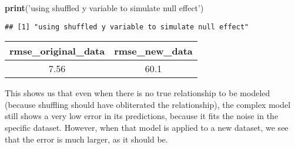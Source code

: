 \documentclass[]{book}
\newenvironment{Shaded}{\begin{snugshade}}{\end{snugshade}}
\newcommand{\KeywordTok}[1]{\textcolor[rgb]{0.13,0.29,0.53}{\textbf{#1}}}
\newcommand{\DataTypeTok}[1]{\textcolor[rgb]{0.13,0.29,0.53}{#1}}
\newcommand{\DecValTok}[1]{\textcolor[rgb]{0.00,0.00,0.81}{#1}}
\newcommand{\StringTok}[1]{\textcolor[rgb]{0.31,0.60,0.02}{#1}}
\newcommand{\OtherTok}[1]{\textcolor[rgb]{0.56,0.35,0.01}{#1}}
\newcommand{\OperatorTok}[1]{\textcolor[rgb]{0.81,0.36,0.00}{\textbf{#1}}}
\newcommand{\NormalTok}[1]{#1}
\theoremstyle{definition}
\theoremstyle{definition}
\theoremstyle{definition}
\theoremstyle{remark}
\begin{document}
\begin{Shaded}
\begin{Highlighting}[]
\KeywordTok{print}\NormalTok{(}\StringTok{'using shuffled y variable to simulate null effect'}\NormalTok{)}
\end{Highlighting}
\end{Shaded}

\begin{verbatim}
## [1] "using shuffled y variable to simulate null effect"
\end{verbatim}

\begin{Shaded}
\end{Shaded}

\begin{longtable}[]{@{}cc@{}}
\toprule
\begin{minipage}[b]{0.27\columnwidth}\centering\strut
rmse\_original\_data\strut
\end{minipage} & \begin{minipage}[b]{0.20\columnwidth}\centering\strut
rmse\_new\_data\strut
\end{minipage}\tabularnewline
\midrule
\endhead
\begin{minipage}[t]{0.27\columnwidth}\centering\strut
7.56\strut
\end{minipage} & \begin{minipage}[t]{0.20\columnwidth}\centering\strut
60.1\strut
\end{minipage}\tabularnewline
\bottomrule
\end{longtable}

This shows us that even when there is no true relationship to be modeled
(because shuffling should have obliterated the relationship), the
complex model still shows a very low error in its predictions, because
it fits the noise in the specific dataset. However, when that model is
applied to a new dataset, we see that the error is much larger, as it
should be.
\end{document}
